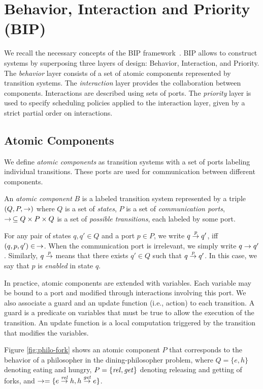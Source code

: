 \section{Behavior, Interaction and Priority (BIP)}
\label{sec:bip}
We recall the necessary concepts of the BIP framework~\cite{bip2}.
BIP allows to construct systems by superposing three layers of design: Behavior, Interaction, and Priority.
The \emph{behavior} layer consists of a set of atomic components represented by transition systems. 
The \emph{interaction} layer provides the collaboration between components. 
Interactions are described using sets of ports. 
The \emph{priority} layer is used to specify scheduling policies applied to the interaction layer, given by a strict partial order on interactions.

\subsection{Atomic Components}
We define \emph{atomic components} as transition systems with a set of ports labeling individual transitions. These ports are used for communication between different components.

\begin{definition}
An  {\em atomic component} $B$ is a labeled transition system represented by a triple $(Q,P,\goesto)$ where $Q$ is a set of {\em states}, $P$ is a set of {\em communication ports}, $\goesto\, \subseteq Q\times P\times Q$ is a set of {\em possible transitions}, each labeled by some port.
\end{definition}

For any pair of states $q,q'\in Q$ and a port $p\in P$, we write $q \goesto[p] q'$, iff $(q,p,q')\in\,\goesto$. When the communication port is irrelevant, we simply write $q \goesto q'$. Similarly, $q \goesto[p]$ means that there exists $q'\in Q$ such that $q \goesto[p] q'$. In this case, we say that $p$ is \emph{enabled} in state $q$.

In practice, atomic components are extended with variables. Each variable may be
bound to a port and modified through interactions involving this port. We also
associate a guard and an update function (i.e., action) to each transition. A guard is a
predicate on variables that must be true to allow the execution of the
transition. An update function is a local computation triggered by the
transition that modifies the variables. 

Figure \ref{fig:philo-fork} shows an atomic component $P$ that corresponds to the behavior of a philosopher in the dining-philosopher problem, where $Q = \{e,h\}$ denoting eating and hungry, $P = \{\release, \get\}$ denoting releasing and getting of forks, and $\goesto = \{e \goesto[\release] h, h \goesto[\get] e\}$.


